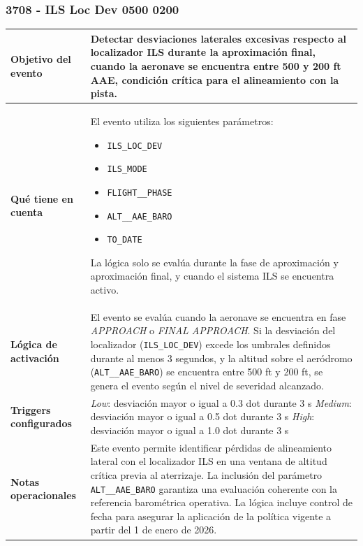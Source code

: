 \documentclass[11pt,a4paper]{article}
\begin{document}
	\subsubsection{3708 - ILS Loc Dev 0500 0200}
	
	\begin{longtable}{p{5cm} p{9.5cm}}
		\hline
		\textbf{Objetivo del evento} &
		Detectar desviaciones laterales excesivas respecto al localizador ILS durante la aproximación final, cuando la aeronave se encuentra entre 500 y 200 ft AAE, condición crítica para el alineamiento con la pista. \\
		\hline
		
		\textbf{Qué tiene en cuenta} &
		El evento utiliza los siguientes parámetros:
		\begin{itemize}
			\item \texttt{ILS\_LOC\_DEV}
			\item \texttt{ILS\_MODE}
			\item \texttt{FLIGHT\_\_PHASE}
			\item \texttt{ALT\_\_AAE\_BARO}
			\item \texttt{TO\_DATE}
		\end{itemize}
		La lógica solo se evalúa durante la fase de aproximación y aproximación final, y cuando el sistema ILS se encuentra activo. \\
		\hline
		
		\textbf{Lógica de activación} &
		El evento se evalúa cuando la aeronave se encuentra en fase \textit{APPROACH} o \textit{FINAL APPROACH}.  
		Si la desviación del localizador (\texttt{ILS\_LOC\_DEV}) excede los umbrales definidos durante al menos 3 segundos, y la altitud sobre el aeródromo (\texttt{ALT\_\_AAE\_BARO}) se encuentra entre 500 ft y 200 ft, se genera el evento según el nivel de severidad alcanzado. \\
		\hline
		
		\textbf{Triggers configurados} &
		\textit{Low}: desviación mayor o igual a 0.3 dot durante 3 s \newline
		\textit{Medium}: desviación mayor o igual a 0.5 dot durante 3 s \newline
		\textit{High}: desviación mayor o igual a 1.0 dot durante 3 s \\
		\hline
		
		\textbf{Notas operacionales} &
		Este evento permite identificar pérdidas de alineamiento lateral con el localizador ILS en una ventana de altitud crítica previa al aterrizaje.  
		La inclusión del parámetro \texttt{ALT\_\_AAE\_BARO} garantiza una evaluación coherente con la referencia barométrica operativa.  
		La lógica incluye control de fecha para asegurar la aplicación de la política vigente a partir del 1 de enero de 2026. \\
		\hline
	\end{longtable} \newpage
	
\end{document}
